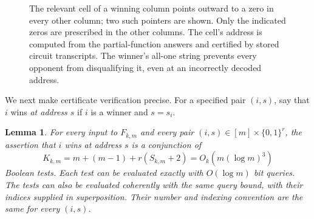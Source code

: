 \documentclass[11pt]{article}
\newtheorem{lemma}[theorem]{Lemma}
\theoremstyle{definition}
\newcommand{\bits}{\{0,1\}}
\begin{document}
\begin{figure}[t]
\centering
{}
\caption{The relevant cell of a winning column points outward to a zero
in every other column; two such pointers are shown. Only the indicated
zeros are prescribed in the other columns. The cell's address is
computed from the partial-function answers and certified by stored
circuit transcripts. The winner's all-one string prevents every opponent
from disqualifying it, even at an incorrectly decoded address.}
\label{fig:outward}
\end{figure}

\FloatBarrier

We next make certificate verification precise.  For a specified pair
$(i,s)$, say that $i$ wins \emph{at address $s$} if $i$ is a winner and
$s=s_i$.

\begin{lemma}\label{lem:local-tests}
For every input to $F_{k,m}$ and every pair $(i,s)\in[m]\times\bits^r$,
the assertion that $i$ wins at address $s$ is a conjunction of
\[
 K_{k,m}=m+(m-1)+r(S_{k,m}+2)
        =O_k(m(\log m)^3)
\]
Boolean tests.  Each test can be evaluated exactly with $O(\log m)$ bit
queries.  The tests can also be evaluated coherently with the same query
bound, with their indices supplied in superposition.  Their number and
indexing convention are the same for every $(i,s)$.
\end{lemma}
\end{document}
